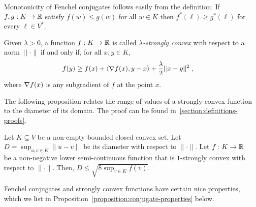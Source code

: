 Monotonicity of Fenchel conjugates follows easily from the definition: If
$f,g:K \to \mathbb{R}$ satisfy $f(w) \le g(w)$ for all $w \in K$ then $f^*(\ell) \ge
g^*(\ell)$ for every $\ell \in V^*$.

Given $\lambda > 0$, a function $f:K \to \mathbb{R}$ is called \emph{$\lambda$-strongly
convex} with respect to a norm $\|\cdot\|$ if and only if, for all $x,y \in K$,
$$
f(y) \ge f(x) + \langle \nabla f(x), y - x \rangle + \frac{\lambda}{2}\|x - y\|^2 \; ,
$$
where $\nabla f(x)$ is any subgradient of $f$ at the point $x$.

The following proposition relates the range of values of a strongly convex
function to the diameter of its domain. The proof can be found
in~\ref{section:definitions-proofs}.

\begin{proposition}
\label{proposition:diameter-vs-range}
Let $K \subseteq V$ be a non-empty bounded closed convex set.  Let $D =
\sup_{u,v \in K} \|u - v\|$ be its diameter with respect to $\|\cdot\|$.  Let
$f:K \to \mathbb{R}$ be a non-negative lower semi-continuous function that is
$1$-strongly convex with respect to $\|\cdot\|$.  Then, $D \le \sqrt{8 \sup_{v
\in K} f(v)}$.
\end{proposition}

Fenchel conjugates and strongly convex functions have certain nice properties,
which we list in Proposition~\ref{proposition:conjugate-properties} below.


